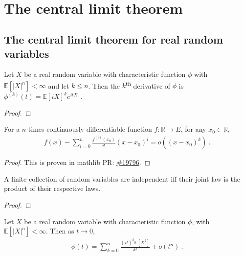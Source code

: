 \chapter{The central limit theorem}

\section{The central limit theorem for real random variables}

\begin{lemma}\label{lem:deriv_charFun}
\leanok
{}
Let $X$ be a real random variable with characteristic function $\phi$ with $\mathbb{E}[\vert X \vert^n] < \infty$ and let $k \le n$.
Then the $k$\textsuperscript{th} derivative of $\phi$ is
$\phi^{(k)}(t) = \mathbb{E}[i X]^k e^{i t X}$ \: .
\end{lemma}

\begin{proof}\leanok
{}
\end{proof}

\begin{lemma}\label{lem:taylor_peano}
\leanok
{}
For a $n$-times continuously differentiable function $f : \mathbb{R} \to E$, for any $x_0\in\mathbb{R}$,
\begin{align*}
f(x) - \sum_{i=0}^n\frac{f^{(i)}(x_0)}{i!}(x-x_0)^i = o((x - x_0)^k)
\: .
\end{align*}
\end{lemma}

\begin{proof}
This is proven in mathlib PR: \href{https://github.com/leanprover-community/mathlib4/pull/19796}{\#19796}.
\end{proof}

\begin{lemma}\label{lem:iIndepFun_iff_pi_map_eq_map}
\mathlibok
{}
A finite collection of random variables are independent iff their joint law is the product of their respective laws.
\end{lemma}

\begin{proof}\leanok
\end{proof}

\begin{lemma}\label{lem:charFun_taylor}
\leanok
{}
Let $X$ be a real random variable with characteristic function $\phi$, with $\mathbb{E}[\vert X \vert^n] < \infty$. Then as $t \to 0$,
\begin{align*}
\phi(t) = \sum_{k=0}^n \frac{(it)^k \mathbb{E}[X^k]}{k!} + o(t^n)
\: .
\end{align*}
\end{lemma}

